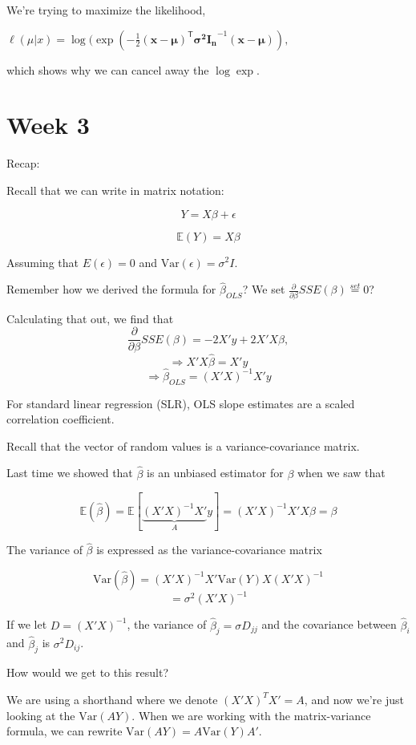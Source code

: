 \documentclass[
  letterpaper,
  DIV=11,
  numbers=noendperiod]{scrreport}
\begin{document}
We're trying to maximize the likelihood,

\(\ell (\mu|x)= \log (\exp \left(-{\frac {1}{2}}(\mathbf {x} -{\boldsymbol {\mu }})^{\mathsf {T}}{\boldsymbol {\sigma^2 I_n }}^{-1}(\mathbf {x} -{\boldsymbol {\mu }})\right),\)

which shows why we can cancel away the \(\log \exp\).


\hypertarget{week-3}{%
\chapter{Week 3}\label{week-3}}

Recap:

Recall that we can write in matrix notation:

\[Y = X\beta + \epsilon\]

\[\mathbb E(Y) = X\beta\]

Assuming that \(E(\epsilon) = 0\) and
\(\text{Var}(\epsilon) = \sigma^2I\).

Remember how we derived the formula for \(\hat \beta_{OLS}\)? We set
\(\frac{\partial}{\partial \beta} SSE(\beta) \stackrel{set}{=} 0\)?

Calculating that out, we find that
\[ \frac{\partial}{\partial \beta} SSE(\beta) = -2X'y + 2X'X\beta, \]
\[ \Longrightarrow X'X \hat \beta = X' y\]
\[ \Longrightarrow \hat \beta_{OLS} = (X'X)^{-1}X'y\]

For standard linear regression (SLR), OLS slope estimates are a scaled
correlation coefficient.

Recall that the vector of random values is a variance-covariance matrix.

Last time we showed that \(\hat \beta\) is an unbiased estimator for
\(\beta\) when we saw that

\[\mathbb E(\hat \beta) = \mathbb E[\underbrace{(X'X)^{-1} X'}_{A} y] = (X'X)^{-1} X'X \beta = \beta\]

The variance of \(\hat \beta\) is expressed as the variance-covariance
matrix

\[\text{Var}(\hat \beta) = (X'X)^{-1} X' \text{Var}(Y) X (X'X)^{-1}\]
\[ = \sigma^2 (X'X)^{-1}\]

If we let \(D = (X'X)^{-1}\), the variance of
\(\hat \beta_j = \sigma D_{jj}\) and the covariance between
\(\hat \beta_i\) and \(\hat \beta_j\) is \(\sigma^2 D_{ij}\).

How would we get to this result?

We are using a shorthand where we denote \((X'X)^TX' = A\), and now
we're just looking at the \(\text{Var}(AY)\). When we are working with
the matrix-variance formula, we can rewrite
\(\text{Var}(AY) = A\text{Var}(Y)A'\).
\end{document}
